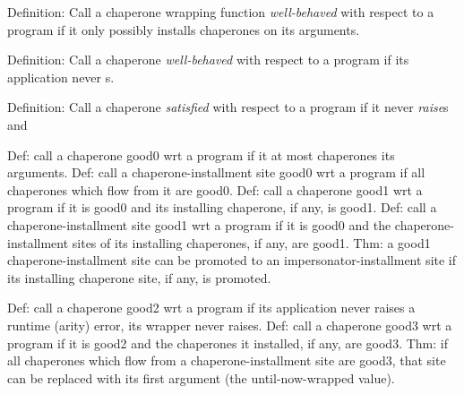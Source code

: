 \documentclass{sigplanconf}
\begin{document}
Definition: Call a chaperone wrapping function \emph{well-behaved} with respect to a program if it only possibly installs chaperones on its arguments.

Definition: Call a chaperone \emph{well-behaved} with respect to a program if its application never s.

Definition: Call a chaperone \emph{satisfied} with respect to a program if it never \emph{raise}s and 

Def: call a chaperone good0 wrt a program if it at most chaperones its arguments.
Def: call a chaperone-installment site good0 wrt a program if all chaperones which flow from it are good0.
Def: call a chaperone good1 wrt a program if it is good0 and its installing chaperone, if any, is good1.
Def: call a chaperone-installment site good1 wrt a program if it is good0 and the chaperone-installment sites of its installing chaperones, if any, are good1.
Thm: a good1 chaperone-installment site can be promoted to an impersonator-installment site if its installing chaperone site, if any, is promoted.




Def: call a chaperone good2 wrt a program if its application never raises a runtime (arity) error, its wrapper never raises.
Def: call a chaperone good3 wrt a program if it is good2 and the chaperones it installed, if any, are good3.
Thm: if all chaperones which flow from a chaperone-installment site are good3, that site can be replaced with its first argument (the until-now-wrapped value).


\end{document}
